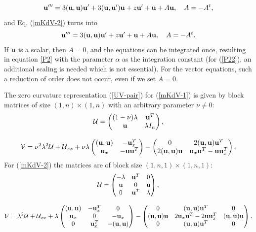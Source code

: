 \documentclass[11pt]{article}
\theoremstyle{plain}
\theoremstyle{definition}
\begin{document}
\begin{equation}\label{P21}
 {\bf u}'''= 3({\bf u},{\bf u}){\bf u}'+3({\bf u},{\bf u}'){\bf u}+z{\bf u}'+{\bf u}+A{\bf u},\quad  A=-A^t,  
\end{equation}
and Eq. (\ref{mKdV-2}) turns into
\begin{equation}\label{P22}
 {\bf u}'''= 3({\bf u},{\bf u}){\bf u}'+z{\bf u}'+{\bf u}+A{\bf u},\quad A=-A^t.
\end{equation}
If ${\bf u}$ is a scalar, then $A=0$, and the equations can be integrated once, resulting in equation \ref{P2} with the parameter $\alpha$ as the integration constant (for (\ref{P22}), an additional scaling is needed which is not essential). For the vector equations, such a reduction of order does not occur, even if we set $A=0$. 

The zero curvature representation (\ref{UV-pair}) for (\ref{mKdV-1}) is given by block matrices of size $(1,n)\times(1,n)$ with an arbitrary parameter $\nu\ne0$:
\begin{gather*}
 {\cal U}=\begin{pmatrix}
   (1-\nu)\lambda & {\bf u}^T \\ 
   {\bf u} & \lambda I_n   
 \end{pmatrix},\\[3mm]
 {\cal V}=\nu^2\lambda^2{\cal U}+{\cal U}_{xx}
 +\nu\lambda\begin{pmatrix}
   ({\bf u},{\bf u}) & -{\bf u}^T_x \\ 
   {\bf u}_x & -{\bf u}{\bf u}^T   
 \end{pmatrix}
 -\begin{pmatrix}
   0 & 2({\bf u},{\bf u}){\bf u}^T \\ 
   2({\bf u},{\bf u}){\bf u} & {\bf u}_x{\bf u}^T-{\bf u}{\bf u}^T_x   
 \end{pmatrix}.
\end{gather*}
For (\ref{mKdV-2}) the matrices are of block size $(1,n,1)\times(1,n,1)$:
\begin{gather*}
 {\cal U}=\begin{pmatrix}
   -\lambda & {\bf u}^T & 0\\ 
    {\bf u} & 0 & {\bf u}\\   
    0 & {\bf u}^T & \lambda 
 \end{pmatrix},\\[3mm]
 {\cal V}=\lambda^2{\cal U}+{\cal U}_{xx}
 +\lambda\begin{pmatrix}
   ({\bf u},{\bf u}) & -{\bf u}^T_x & 0\\ 
   {\bf u}_x & 0 & -{\bf u}_x\\
   0 & {\bf u}^T_x & -({\bf u},{\bf u})\\
 \end{pmatrix}
 -\begin{pmatrix}
   0 & ({\bf u},{\bf u}){\bf u}^T & 0\\ 
   ({\bf u},{\bf u}){\bf u} & 2{\bf u}_x{\bf u}^T-2{\bf u}{\bf u}^T_x & ({\bf u},{\bf u}){\bf u}\\   
   0 & ({\bf u},{\bf u}){\bf u}^T & 0
 \end{pmatrix}.
\end{gather*}
\end{document}
